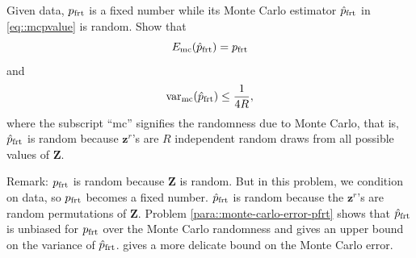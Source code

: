 \begin{HomeworkProblem}\label{exr:3-2}

Given data, $p_{\text{frt}}$ is a fixed number while its Monte Carlo estimator $\hat p_{\text{frt}}$ in \eqref{eq::mcpvalue} is random.
Show that
\[
E_{\text{mc}} (\hat p_{\text{frt}}) =   p_{\text{frt}}
\]
and
\[
\textup{var}_{\text{mc}} (\hat p_{\text{frt}})  \leq \frac{1}{4R},
\]
where the subscript ``mc'' signifies the randomness due to Monte Carlo, that is, $\hat p_{\text{frt}}$ is random because $\mathbf{z}^r$'s are $R$ independent random draws from all possible values of $\mathbf{Z}$.


Remark: $p_{\text{frt}}$ is random because $\mathbf{Z}$ is random. But in this problem, we condition on data, so $p_{\text{frt}}$ becomes a fixed number. $\hat p_{\text{frt}}$ is random because the $\mathbf{z}^r$'s are random permutations of $\mathbf{Z}$.
Problem \ref{para::monte-carlo-error-pfrt} shows that $\hat p_{\text{frt}}$ is unbiased for $p_{\text{frt}}$ over the Monte Carlo randomness and gives an upper bound on the variance of $\hat p_{\text{frt}}$. \citet[][Theorem 2]{luo2021leveraging} gives a more delicate bound on the Monte Carlo error.




\end{HomeworkProblem}

